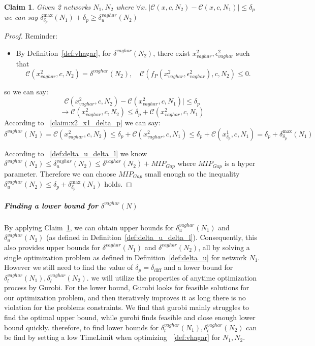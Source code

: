 \documentclass[11pt]{article}
\newtheorem{claim}{Claim}
\begin{document}
\begin{claim}\label{claim:delta_u1_and_delt2a}
Given 2 networks $N_1,N_2$ where $\forall x.\ |\mathcal{C}(x,c,N_2)-\mathcal{C}(x,c,N_1)|\leq \delta_p$ we can say $ \delta^\text{max}_{\delta_p}(N_1)+\delta_p \geq \delta_u^{vaghar}(N_2)$
\end{claim}
\begin{proof}
Reminder:
\begin{itemize}
\item By Definition~\ref{def:vhagar}, for $\delta^{vaghar}(N_2)$, there exist $x^2_{vaghar}, \epsilon^2_{vaghar}$ such that
    \[
    \mathcal{C}(x^2_{vaghar}, c, N_2) = \delta^{vaghar}(N_2), \quad \mathcal{C}(f_P(x^2_{vaghar}, \epsilon^2_{vaghar}), c, N_2) \leq 0.
    \]
\end{itemize}
so we can say:
$$\mathcal{C}(x^2_{vaghar},c,N_2)-\mathcal{C}(x^2_{vaghar},c,N_1)|\leq \delta_p$$
$$ \rightarrow \mathcal{C}(x^2_{vaghar},c,N_2) \leq \delta_p+\mathcal{C}(x^2_{vaghar},c,N_1)$$
According to ~\ref{claim:x2_x1_delta_p} we can say:
$$ \delta^{vaghar}(N_2)=\mathcal{C}(x^2_{vaghar},c,N_2) \leq \delta_p+\mathcal{C}(x^2_{vaghar},c,N_1) \leq \delta_p+ \mathcal{C}(x^1_{\delta_p}, c, N_1)=\delta_p+\delta^\text{max}_{\delta_p}(N_1)$$

According to ~\ref{def:delta_u_delta_l} we know $\delta^{vaghar}(N_2) \leq \delta^{vaghar}_u(N_2) \leq \delta^{vaghar}(N_2) + MIP_{Gap}$ where $MIP_{Gap}$ is a hyper parameter. Therefore we can choose $MIP_{Gap}$ small enough so the inequality $\delta^{vaghar}_u(N_2) \leq \delta_p+\delta^\text{max}_{\delta_p}(N_1)$ holds.

\end{proof}

\subparagraph{Finding a lower bound for $\delta^{vaghar}(N)$}
By applying Claim~\ref{claim:delta_u1_and_delt2a}, we can obtain upper bounds for $\delta_u^{vaghar}(N_1)$ and $\delta_u^{vaghar}(N_2)$ (as defined in Definition~\ref{def:delta_u_delta_l}). Consequently, this also provides upper bounds for $\delta^{vaghar}(N_1)$ and $\delta^{vaghar}(N_2)$, all by solving a single optimization problem as defined in Definition~\ref{def:delta_u} for network $N_1$. However we still need to find the value of $\delta_p=\delta_\text{diff}$ and a lower bound for $\delta_l^{vaghar}(N_1),\delta_l^{vaghar}(N_2)$. we will utilize the properties of anytime optimization process by Gurobi. For the lower bound, Gurobi looks for feasible solutions for our optimization problem, and then iteratively improves it as long there is no violation for the problems constraints. We find that gurobi mainly struggles to find the optimal upper bound, while gurobi finds feasible and close enough lower bound quickly. therefore, to find lower bounds for $\delta_l^{vaghar}(N_1),\delta_l^{vaghar}(N_2)$ can be find by setting a low TimeLimit when optimizing ~\ref{def:vhagar} for $N_1,N_2$.
\end{document}

